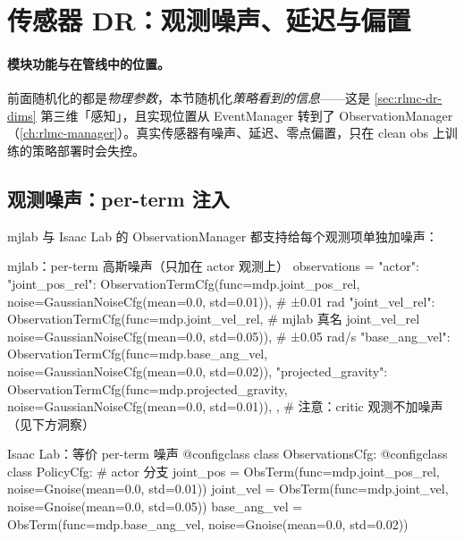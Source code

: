 \section{传感器 DR：观测噪声、延迟与偏置}
\label{sec:rlmc-dr-sensor}

\paragraph{模块功能与在管线中的位置。}前面随机化的都是\emph{物理参数}，本节随机化\emph{策略看到的信息}——这是 \cref{sec:rlmc-dr-dims} 第三维「感知」，且实现位置从 EventManager 转到了 ObservationManager（\cref{ch:rlmc-manager}）。真实传感器有噪声、延迟、零点偏置，只在 clean obs 上训练的策略部署时会失控。

\subsection{观测噪声：per-term 注入}
\label{sec:rlmc-dr-sensor-noise}

mjlab 与 Isaac Lab 的 ObservationManager 都支持给每个观测项单独加噪声：

\begin{codebox}[Python]{mjlab：per-term 高斯噪声（只加在 actor 观测上）}
observations = {
  "actor": {
    "joint_pos_rel": ObservationTermCfg(func=mdp.joint_pos_rel,
        noise=GaussianNoiseCfg(mean=0.0, std=0.01)),   # ±0.01 rad
    "joint_vel_rel": ObservationTermCfg(func=mdp.joint_vel_rel,  # mjlab 真名 joint_vel_rel
        noise=GaussianNoiseCfg(mean=0.0, std=0.05)),   # ±0.05 rad/s
    "base_ang_vel":  ObservationTermCfg(func=mdp.base_ang_vel,
        noise=GaussianNoiseCfg(mean=0.0, std=0.02)),
    "projected_gravity": ObservationTermCfg(func=mdp.projected_gravity,
        noise=GaussianNoiseCfg(mean=0.0, std=0.01)),
  },
  # 注意：critic 观测不加噪声（见下方洞察）
}
\end{codebox}

\begin{codebox}[Python]{Isaac Lab：等价 per-term 噪声}
@configclass
class ObservationsCfg:
    @configclass
    class PolicyCfg:                                    # actor 分支
        joint_pos    = ObsTerm(func=mdp.joint_pos_rel,
            noise=Gnoise(mean=0.0, std=0.01))
        joint_vel    = ObsTerm(func=mdp.joint_vel,
            noise=Gnoise(mean=0.0, std=0.05))
        base_ang_vel = ObsTerm(func=mdp.base_ang_vel,
            noise=Gnoise(mean=0.0, std=0.02))
\end{codebox}

